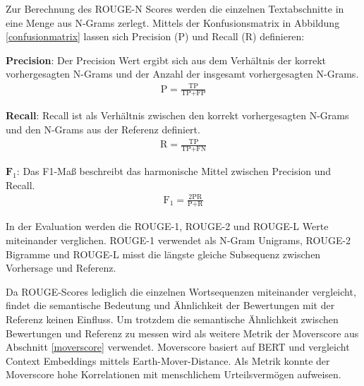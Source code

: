 Zur Berechnung des ROUGE-N Scores werden die einzelnen Textabschnitte in eine Menge aus N-Grams zerlegt.
Mittels der Konfusionsmatrix in Abbildung \ref{confusionmatrix} lassen sich Precision (P) und Recall (R) definieren:
\begin{addmargin}[30pt]{30pt}
    \textbf{Precision}: 
    Der Precision Wert ergibt sich aus dem Verhältnis der korrekt vorhergesagten N-Grams und der Anzahl der insgesamt vorhergesagten N-Grams.
    \begin{align*}
    \text{P} = \frac{\text{TP}}{\text{TP}+\text{FP}}
    \end{align*}

    \textbf{Recall}:
    Recall ist als Verhältnis zwischen den korrekt vorhergesagten N-Grams und den N-Grams aus der Referenz definiert.
    \begin{align*}
    \text{R} = \frac{\text{TP}}{\text{TP}+\text{FN}}
    \end{align*}

    $\textbf{F}_1$:
    Das F1-Maß beschreibt das harmonische Mittel zwischen Precision und Recall.
    \begin{align*}
    \text{F}_{1} = \frac{2\text{PR}}{\text{P}+\text{R}}
    \end{align*}
\end{addmargin}

In der Evaluation werden die ROUGE-1, ROUGE-2 und ROUGE-L Werte miteinander verglichen.
ROUGE-1 verwendet als N-Gram Unigrams, ROUGE-2 Bigramme und ROUGE-L misst die längste gleiche Subsequenz zwischen Vorhersage und Referenz.

Da ROUGE-Scores lediglich die einzelnen Wortsequenzen miteinander vergleicht, findet die semantische Bedeutung und Ähnlichkeit der Bewertungen mit der Referenz keinen Einfluss.
Um trotzdem die semantische Ähnlichkeit zwischen Bewertungen und Referenz zu messen wird als weitere Metrik der Moverscore aus Abschnitt \ref{moverscore} verwendet.
Moverscore basiert auf BERT und vergleicht Context Embeddings mittels Earth-Mover-Distance. Als Metrik konnte der Moverscore hohe Korrelationen mit menschlichem Urteilsvermögen aufweisen.


